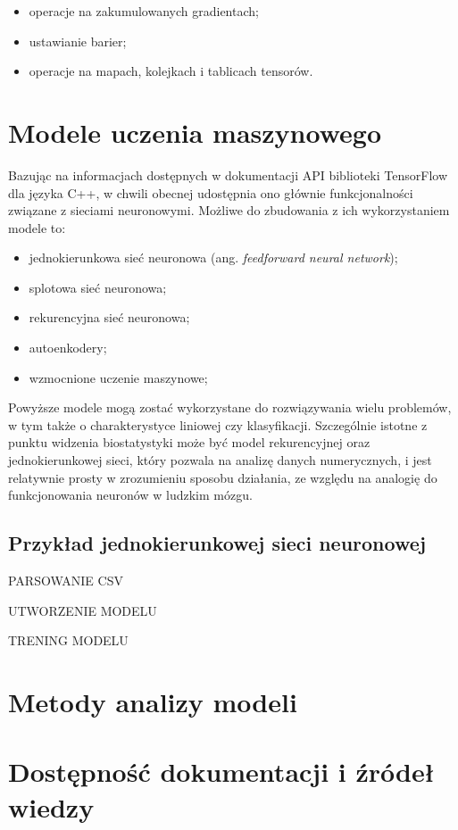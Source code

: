 \begin{itemize}
	\item operacje na zakumulowanych gradientach;
	\item ustawianie barier;
	\item operacje na mapach, kolejkach i tablicach tensorów.
	
\end{itemize}

\section{Modele uczenia maszynowego}

Bazując na informacjach dostępnych w dokumentacji API biblioteki TensorFlow dla języka C++, w chwili obecnej udostępnia ono głównie funkcjonalności związane z sieciami neuronowymi. Możliwe do zbudowania z ich wykorzystaniem modele to:

\begin{itemize}
	\item jednokierunkowa sieć neuronowa (ang. \textit{feedforward neural network});
	\item splotowa sieć neuronowa;
	\item rekurencyjna sieć neuronowa;
	\item autoenkodery;
	\item wzmocnione uczenie maszynowe;
\end{itemize}

Powyższe modele mogą zostać wykorzystane do rozwiązywania wielu problemów, w tym także o charakterystyce liniowej czy klasyfikacji. Szczególnie istotne z punktu widzenia biostatystyki może być model rekurencyjnej oraz jednokierunkowej sieci, który pozwala na analizę danych numerycznych, i jest relatywnie prosty w zrozumieniu sposobu działania, ze względu na analogię do funkcjonowania neuronów w ludzkim mózgu.

\subsection{Przykład jednokierunkowej sieci neuronowej}

PARSOWANIE CSV

UTWORZENIE MODELU

TRENING MODELU

\section{Metody analizy modeli}
\section{Dostępność dokumentacji i źródeł wiedzy}